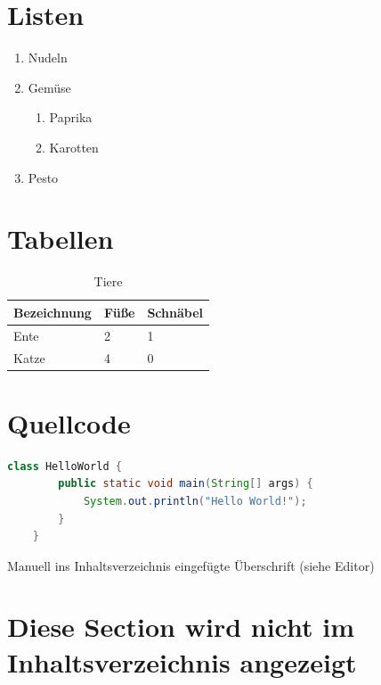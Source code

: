 \section{Listen}
\begin{enumerate}[label=\arabic*.]
    \item Nudeln
    \item Gemüse
    \begin{enumerate}[label=\arabic{enumi}.\arabic*.]
        \item Paprika
        \item Karotten
    \end{enumerate}
    \item Pesto
\end{enumerate}

\section{Tabellen}
\begin{table}[H]
    \centering
    \begin{tabular}[H]{l|l|l}
        Bezeichnung & Füße& Schnäbel\\
        \hline
        Ente& 2& 1\\
        \hline
        Katze& 4& 0\\
    \end{tabular}
    \caption{Tiere}
\end{table}


\section{Quellcode}
\begin{lstlisting}[language=java, caption=Hello World in Java, captionpos=b]
    class HelloWorld {
        public static void main(String[] args) {
            System.out.println("Hello World!");
        }
    }
\end{lstlisting}

Manuell ins Inhaltsverzeichnis eingefügte Überschrift (siehe Editor)

\section*{Diese Section wird nicht im Inhaltsverzeichnis angezeigt} %